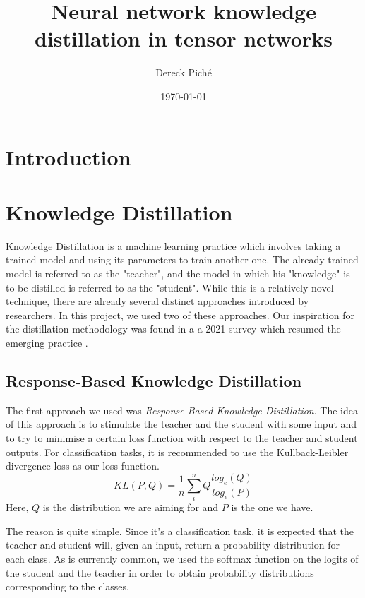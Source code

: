 \documentclass{article}
\title{Neural network knowledge distillation in tensor networks}
\author{Dereck Piché}
\date{\today}
\theoremstyle{definition}
\theoremstyle{definition}
\begin{document}
\maketitle

\begin{abstract}
\end{abstract}

\section{Introduction}



\section{Knowledge Distillation}
Knowledge Distillation is a machine learning practice which involves
taking a trained model and using its parameters to train another one.
The already trained model is referred to as the "teacher", and 
the model in which his "knowledge" is to be distilled is referred to as
the "student". While this is a relatively novel technique, there are 
already several distinct approaches introduced by researchers.
In this project, we used two of these approaches. Our inspiration for the distillation 
methodology was found in a a 2021 survey which resumed the emerging 
practice \cite{Gou_2021}.

\subsection{Response-Based Knowledge Distillation}
The first approach we used was \emph{Response-Based Knowledge Distillation}. The idea of this approach is to stimulate the teacher and the student with some input and to try to minimise a certain loss function with respect to the teacher and student outputs. For classification tasks, it is recommended to use the Kullback-Leibler divergence loss as our loss function. 
\begin{equation}
    KL(P, Q) = \frac{1}{n} \sum_i^n Q \frac{log_e(Q)}{log_e(P)}
\end{equation}
Here, $Q$ is the distribution we are aiming for and $P$ is the one we have.

The reason is quite simple. Since it's a classification task, it is expected that the teacher and student will, given an input, return a probability distribution for each class. As is currently common, we used the softmax function on the logits of the student and the teacher in order to obtain probability distributions corresponding to the classes. 
\end{document}
